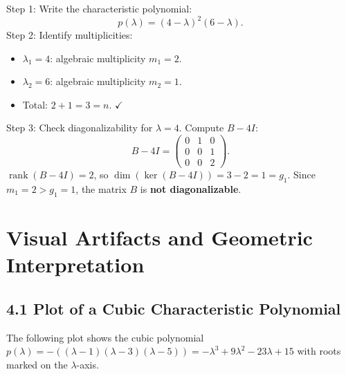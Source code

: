 \documentclass[12pt,a4paper]{article}
\begin{document}
Step 1: Write the characteristic polynomial:
\[
  p(\lambda) = (4-\lambda)^2(6-\lambda).
\]
Step 2: Identify multiplicities:
\begin{itemize}[leftmargin=*]
  \item $\lambda_1 = 4$: algebraic multiplicity $m_1 = 2$.
  \item $\lambda_2 = 6$: algebraic multiplicity $m_2 = 1$.
  \item Total: $2 + 1 = 3 = n$. $\checkmark$
\end{itemize}
Step 3: Check diagonalizability for $\lambda=4$. Compute $B-4I$:
\[
  B - 4I = \begin{pmatrix} 0 & 1 & 0 \\ 0 & 0 & 1 \\ 0 & 0 & 2 \end{pmatrix}.
\]
$\operatorname{rank}(B-4I) = 2$, so $\dim(\ker(B-4I)) = 3-2 = 1 = g_1$.
Since $m_1=2 > g_1=1$, the matrix $B$ is \textbf{not diagonalizable}.

\section{Visual Artifacts and Geometric Interpretation}

\subsection*{4.1 Plot of a Cubic Characteristic Polynomial}

The following plot shows the cubic polynomial
$p(\lambda) = -((\lambda-1)(\lambda-3)(\lambda-5)) = -\lambda^3+9\lambda^2-23\lambda+15$
with roots marked on the $\lambda$-axis.

\begin{center}
\end{center}
\end{document}
